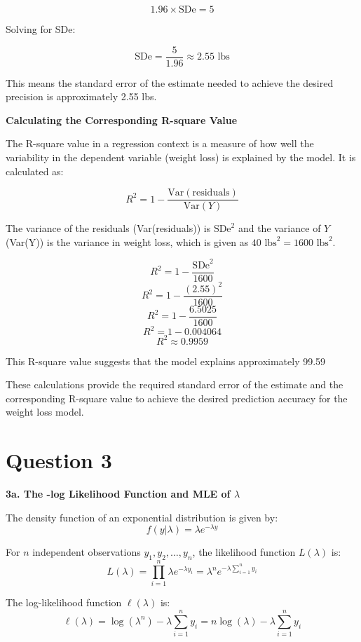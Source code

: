 \documentclass{article}
\begin{document}
\[
1.96 \times \text{SDe} = 5
\]

Solving for SDe:

\[
\text{SDe} = \frac{5}{1.96} \approx 2.55 \text{ lbs}
\]

This means the standard error of the estimate needed to achieve the desired precision is approximately 2.55 lbs.

\textbf{Calculating the Corresponding R-square Value}

The R-square value in a regression context is a measure of how well the variability in the dependent variable (weight loss) is explained by the model. It is calculated as:

\[
R^2 = 1 - \frac{\text{Var}(\text{residuals})}{\text{Var}(Y)}
\]

The variance of the residuals (Var(residuals)) is \( \text{SDe}^2 \) and the variance of \( Y \) (Var(Y)) is the variance in weight loss, which is given as \( 40 \text{ lbs}^2 = 1600 \text{ lbs}^2 \).

\[
R^2 = 1 - \frac{\text{SDe}^2}{1600}
\]
\[
R^2 = 1 - \frac{(2.55)^2}{1600}
\]
\[
R^2 = 1 - \frac{6.5025}{1600}
\]
\[
R^2 = 1 - 0.004064
\]
\[
R^2 \approx 0.9959
\]

This R-square value suggests that the model explains approximately 99.59%

These calculations provide the required standard error of the estimate and the corresponding R-square value to achieve the desired prediction accuracy for the weight loss model.

\section{Question 3}

\textbf{3a. The -log Likelihood Function and MLE of \( \lambda \)}

The density function of an exponential distribution is given by:
\[ f(y|\lambda) = \lambda e^{-\lambda y} \]

For \( n \) independent observations \( y_1, y_2, \ldots, y_n \), the likelihood function \( L(\lambda) \) is:
\[ L(\lambda) = \prod_{i=1}^n \lambda e^{-\lambda y_i} = \lambda^n e^{-\lambda \sum_{i=1}^n y_i} \]

The log-likelihood function \( \ell(\lambda) \) is:
\[ \ell(\lambda) = \log(\lambda^n) - \lambda \sum_{i=1}^n y_i = n \log(\lambda) - \lambda \sum_{i=1}^n y_i \]
\end{document}
